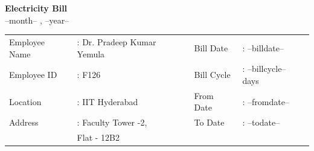 \documentclass[10pt]{article}
\begin{document}
\thispagestyle{empty} %
\begin{center}
  \begin{figure}
  \end{figure}
\end{center}
\centering
{{\color{highlightcolour}  \textbf{\Large Electricity Bill} \\ \vspace{0.25cm} \large --month-- , --year--}} 

\vspace{0.25cm}
\bigskip


\begin{table}[h]
    \centering
    \begin{tabular}{|>{\raggedright} p{3.1cm} >{\raggedright} p{5cm} | >{\raggedright} p{3cm} >{\raggedright\arraybackslash} p{3cm}|}
    \hline
         Employee Name & : Dr. Pradeep Kumar Yemula & Bill Date & : --billdate--  \\
         Employee ID &: F126 & Bill Cycle &: --billcycle-- days\\
         Location &: IIT Hyderabad & From Date &: --fromdate--\\
         Address &: Faculty Tower -2, & To Date &: --todate--\\
         & \hspace{0.1cm} Flat - 12B2 &&\\
         \hline
    \end{tabular}
\end{table}
\vspace{0.25cm}
\bigskip
\end{document}
